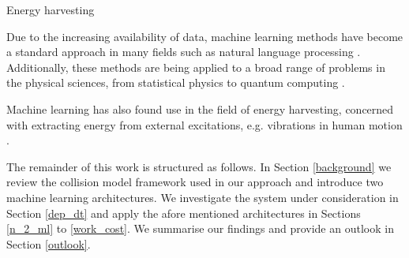 Energy harvesting 

Due to the increasing availability of data, machine learning methods have become a standard approach in many fields such as natural language processing \cite{DBLP:journals/corr/VaswaniSPUJGKP17}.
Additionally, these methods are being applied to a broad range of problems in the physical sciences, from statistical physics to quantum computing \cite{Carleo_2019, wise2021using}.

Machine learning has also found use in the field of energy harvesting, concerned with extracting energy from external excitations, e.g. vibrations in human motion \cite{Liu2019}.


The remainder of this work is structured as follows.
In Section \ref{background} we review the collision model framework used in our approach and introduce two machine learning architectures.
We investigate the system under consideration in Section \ref{dep_dt} and apply the afore mentioned architectures in Sections \ref{n_2_ml} to \ref{work_cost}.
We summarise our findings and provide an outlook in Section \ref{outlook}.